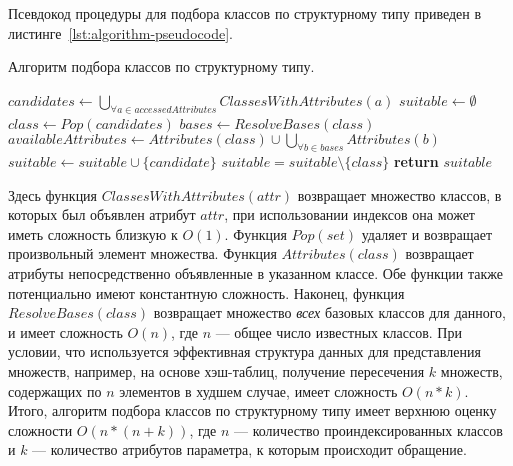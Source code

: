 Псевдокод процедуры для подбора классов по структурному типу приведен в
листинге~\ref{lst:algorithm-pseudocode}. 

\begin{algorithm}
  \caption{Алгоритм подбора классов по структурному типу.}
  \label{lst:algorithm-pseudocode}
  \begin{algorithmic}
  \small
    \State $candidates \gets \bigcup_{\forall a \in accessedAttributes}
    ClassesWithAttributes(a)$
    \State $suitable \gets \emptyset$
      \State $class \gets Pop(candidates)$
      \State $bases \gets ResolveBases(class)$
      \State $availableAttributes \gets Attributes(class) \cup \bigcup_{\forall{b} \in bases} Attributes(b)$
        \State $suitable \gets suitable \cup \{candidate\}$
      \EndIf
    \EndWhile
          \State $suitable = suitable \setminus \{ class \}$
        \EndIf
      \EndFor
    \EndFor
  \State \textbf{return} $suitable$
  \EndFunction
  \end{algorithmic}
\end{algorithm}


Здесь функция $ClassesWithAttributes(attr)$ возвращает множество классов, в
которых был объявлен атрибут $attr$, при использовании индексов она может иметь
сложность близкую к $O(1)$. Функция $Pop(set)$ удаляет и возвращает произвольный
элемент множества. Функция $Attributes(class)$ возвращает атрибуты
непосредственно объявленные в указанном классе. Обе функции также потенциально
имеют константную сложность. Наконец, функция $ResolveBases(class)$ возвращает
множество \emph{всех} базовых классов для данного, и имеет сложность $O(n)$, где
$n$ --- общее число известных классов. 
При условии, что используется эффективная структура данных для представления
множеств, например, на основе хэш-таблиц, получение пересечения $k$ множеств,
содержащих по $n$ элементов в худшем случае, имеет сложность $O(n*k)$. 
Итого, алгоритм подбора классов по структурному типу имеет верхнюю оценку
сложности $O(n* (n + k))$, где $n$ --- количество проиндексированных классов и
$k$ --- количество атрибутов параметра, к которым происходит обращение.

